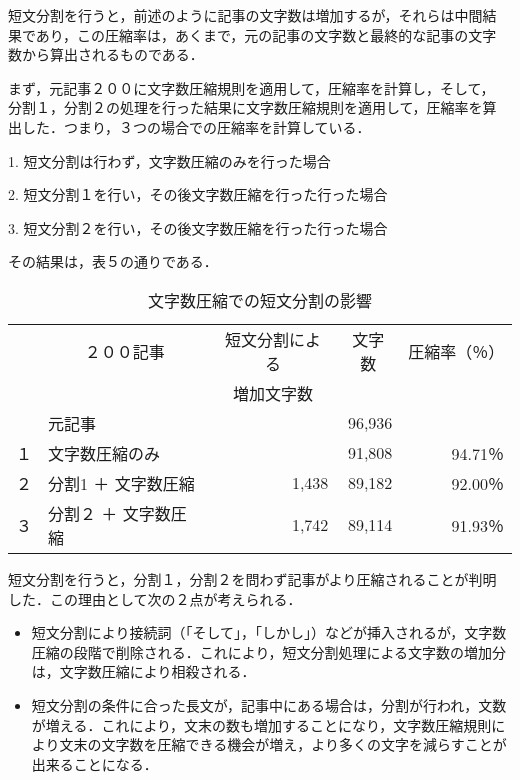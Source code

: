 短文分割を行うと，前述のように記事の文字数は増加するが，それらは中間結
果であり，この圧縮率は，あくまで，元の記事の文字数と最終的な記事の文字
数から算出されるものである．

まず，元記事２００に文字数圧縮規則を適用して，圧縮率を計算し，そして，
分割１，分割２の処理を行った結果に文字数圧縮規則を適用して，圧縮率を算
出した．つまり，３つの場合での圧縮率を計算している．

\begin{list}{}{}
\item[1.] 短文分割は行わず，文字数圧縮のみを行った場合
\item[2.] 短文分割１を行い，その後文字数圧縮を行った行った場合
\item[3.] 短文分割２を行い，その後文字数圧縮を行った行った場合
\end{list}

その結果は，表５の通りである．

\vspace{-3mm}
\begin{table}[h]
\begin{center}
\begin{tabular}{|l|l|r|r|r|} \hline
   & \multicolumn{1}{|c|}{２００記事} & \multicolumn{1}{|c|}{短文分割による} & \multicolumn{1}{|c|}{\hspace{4mm}文字数\hspace*{4mm}} & \multicolumn{1}{|c|}{圧縮率（％）}\\
   &  & \multicolumn{1}{|c|}{増加文字数} &  & \\ \hline
   & 元記事     &                          & 96,936 &             \\ \hline
１ & 文字数圧縮のみ &                      & 91,808 & 94.71％     \\ \hline
２ & 分割1 ＋ 文字数圧縮          & 1,438  & 89,182 & 92.00％     \\ \hline
３ & 分割２ ＋ 文字数圧縮         & 1,742  & 89,114 & 91.93％     \\ \hline
\end{tabular}
\end{center}
\caption{文字数圧縮での短文分割の影響}
\end{table}
\vspace{-5mm}

短文分割を行うと，分割１，分割２を問わず記事がより圧縮されることが判明
した．この理由として次の２点が考えられる．

\begin{itemize}
\item 短文分割により接続詞（「そして」，「しかし」）などが挿入されるが，文字数圧縮の段階で削除される．これにより，短文分割処理による文字数の増加分は，文字数圧縮により相殺される．

\item 短文分割の条件に合った長文が，記事中にある場合は，分割が行われ，文数が増える．これにより，文末の数も増加することになり，文字数圧縮規則により文末の文字数を圧縮できる機会が増え，より多くの文字を減らすことが出来ることになる．
\end{itemize}


